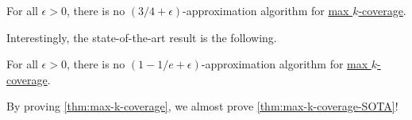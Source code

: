 \begin{theorem}\label{thm:max-k-coverage}
	For all \(\epsilon >0\), there is no \((3 / 4 + \epsilon )\)-approximation algorithm for \hyperref[prb:max-k-coverage]{max \(k\)-coverage}.
\end{theorem}

Interestingly, the state-of-the-art result is the following.

\begin{theorem}\label{thm:max-k-coverage-SOTA}
	For all \(\epsilon >0\), there is no \((1 - 1/e + \epsilon )\)-approximation algorithm for \hyperref[prb:max-k-coverage]{max \(k\)-coverage}.
\end{theorem}

By proving \autoref{thm:max-k-coverage}, we almost prove \autoref{thm:max-k-coverage-SOTA}!